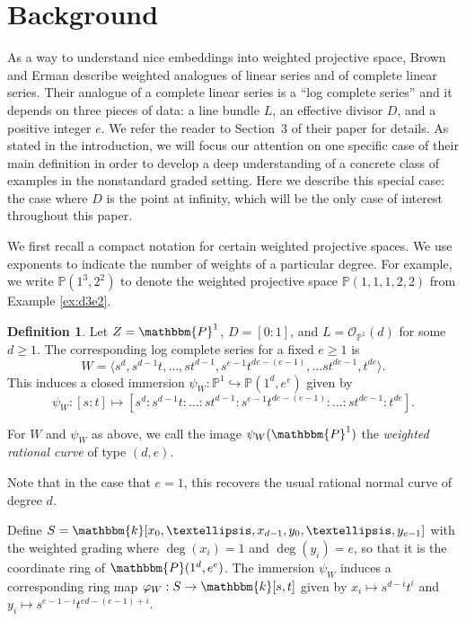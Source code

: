 \documentclass[12pt,reqno]{amsart}
\theoremstyle{definition}
\newtheorem{definition}[theorem]{Definition}
\theoremstyle{remark}
\newcommand{\bbP}{\mathbbm{P}}
\newcommand{\bbk}{\mathbbm{k}}
\newcommand{\ideal}[1]{{\langle #1 \rangle}}
\begin{document}
\section{Background}
\label{sec:Background}

As a way to understand nice embeddings into weighted projective space, Brown and Erman \cite{beLinSyzOCurvesIWProjSp} describe weighted analogues of linear series and of complete linear series.  Their analogue of a complete linear series is a ``log complete series'' and it depends on three pieces of data: a line bundle $L$, an effective divisor $D$, and a positive integer $e$.  We refer the reader to Section~3 of their paper for details.  As stated in the introduction, we will focus our attention on one specific case of their main definition in order to develop a deep understanding of a concrete class of examples in the nonstandard graded setting.  Here we describe this special case: the case where $D$ is the point at infinity, which will be the only case of interest throughout this paper.

We first recall a compact notation for certain weighted projective spaces.  We use exponents to indicate the number of weights of a particular degree.  For example, we write $\mathbb P(1^3,2^2)$ to denote the weighted projective space $\mathbb P(1,1,1,2,2)$ from Example \ref{ex:d3e2}.

\begin{definition}
\label{def:WeightedRationalCurve}
Let $Z=\bbP^1$, $D = [0:1]$, and $L = \mathcal O_{\mathbb P^1}(d)$ for some $d \ge 1$. The corresponding log complete series for a fixed $e \geq 1$ is
\[
W = \ideal{s^d,s^{d-1}t,\ldots,st^{d-1},s^{e-1}t^{de-(e-1)},\ldots st^{de-1},t^{de}}.
\]
This induces a closed immersion $\psi_W \colon \mathbb P^1 \hookrightarrow \mathbb P(1^d,e^e)$ given by 
\[\psi_W \colon [s:t] \mapsto [s^d:s^{d-1}t:\ldots:st^{d-1}:s^{e-1}t^{de-(e-1)}:\ldots:st^{de-1}:t^{de}].\] 

For $W$ and $\psi_W$ as above, we call the image $\psi_W(\bbP^1)$ the \textit{weighted rational curve} of type $(d,e)$.
\end{definition}

Note that in the case that $e=1$, this recovers the usual rational normal curve of degree $d$.

Define $S = \bbk[x_0,\ldots,x_{d-1},y_0,\ldots,y_{e-1}]$ with the weighted grading where $\deg(x_i) = 1$ and $\deg(y_i) = e$, so that it is the coordinate ring of $\bbP(1^d,e^e)$. The immersion $\psi_W$ induces a corresponding ring map $\varphi_W: S \rightarrow \bbk[s,t]$ given by $x_i \mapsto s^{d-i}t^i$ and $y_i \mapsto s^{e-1-i}t^{ed-(e-1)+i}$. 
\end{document}
